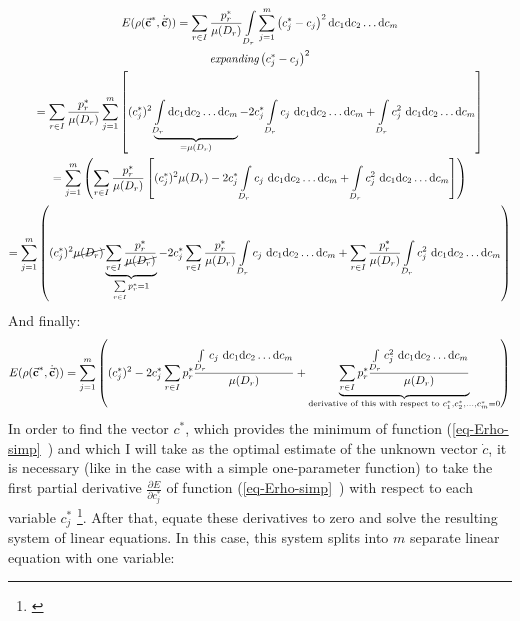 \begin{gather}
\nonumber
E(\rho(\vec{\textbf{c}}^{*},\dot{\vec{\textbf{c}}}))=\sum\limits_{r \in I} \frac{p_{r}^{*}}{\mu(D_{r})} \int\limits_{D_{r}}\sum\limits_{j=1}^{m} \left( c_{j}^{*}-c_{j} \right)^{2}\mathrm{d}c_{1}\mathrm{d}c_{2}\dots \mathrm{d}c_{m}\\
\nonumber
\textit{expanding} \left( c_{j}^{*}-c_{j} \right)^{2} \\
\nonumber
=\sum\limits_{r \in I} \frac{p_{r}^{*}}{\mu(D_{r})} \sum\limits_{j=1}^{m} \left[ (c_{j}^{*})^{2} \underbrace{\int\limits_{D_{r}} \mathrm{d}c_{1}\mathrm{d}c_{2}\dots \mathrm{d}c_{m}}_{{=\mu(D_{r})}} - 2c_{j}^{*} \int\limits_{D_{r}} c_{j} \  \mathrm{d}c_{1}\mathrm{d}c_{2}\dots \mathrm{d}c_{m} + \int\limits_{D_{r}} c_{j}^{2} \  \mathrm{d}c_{1}\mathrm{d}c_{2}\dots \mathrm{d}c_{m}\right]\\
\nonumber
=\sum\limits_{j=1}^{m} \left( \sum\limits_{r \in I} \frac{p_{r}^{*}}{\mu(D_{r})} \left[ (c_{j}^{*})^{2} \mu(D_{r})-2c_{j}^{*} \int\limits_{D_{r}} c_{j} \  \mathrm{d}c_{1}\mathrm{d}c_{2}\dots \mathrm{d}c_{m} + \int\limits_{D_{r}} c_{j}^{2} \  \mathrm{d}c_{1}\mathrm{d}c_{2}\dots \mathrm{d}c_{m} \right] \right)\\ 
=\sum\limits_{j=1}^{m} \left( (c_{j}^{*})^{2} \cancel{\mu(D_{r})} \underbrace{\sum\limits_{r \in I} \frac{p_{r}^{*}}{\cancel{\mu(D_{r})}}}_{\sum\limits_{r \in I}p_{r}^{*} = 1} - 2c_{j}^{*} \sum\limits_{r \in I}\frac{p_{r}^{*}}{\mu(D_{r})} \int\limits_{D_{r}} c_{j} \  \mathrm{d}c_{1}\mathrm{d}c_{2}\dots \mathrm{d}c_{m} + \sum\limits_{r \in I}\frac{p_{r}^{*}}{\mu(D_{r})} \int\limits_{D_{r}} c_{j}^{2} \  \mathrm{d}c_{1}\mathrm{d}c_{2}\dots \mathrm{d}c_{m} \right)
\end{gather}
And finally:
\begin{equation}
E(\rho(\vec{\textbf{c}}^{*},\dot{\vec{\textbf{c}}}))= \sum\limits_{j=1}^{m} \left( (c_{j}^{*})^{2} - 2c_{j}^{*} \sum\limits_{r \in I} p_{r}^{*} \frac{\int\limits_{D_{r}} c_{j} \  \mathrm{d}c_{1}\mathrm{d}c_{2}\dots \mathrm{d}c_{m}}{\mu(D_{r})} + \underbrace{\sum\limits_{r \in I} p_{r}^{*} \frac{\int\limits_{D_{r}} c_{j}^{2} \  \mathrm{d}c_{1}\mathrm{d}c_{2}\dots \mathrm{d}c_{m}}{\mu(D_{r})}}_{\text{derivative of this with respect to } c_{1}^{*}, c_{2}^{*},\dots,c_{m}^{*} = 0} \right) \label{eq-Erho-simp}
\end{equation}
In order to find the vector $c^{*}$, which provides the minimum of function (\vref{eq-Erho-simp}~) and which I will take as the optimal estimate of the unknown vector $\dot{c}$, it is necessary (like in the case with a simple one-parameter function) to take the first partial derivative $\frac{\partial E}{\partial c_{j}^{*}}$ of function (\vref{eq-Erho-simp}~) with respect to each variable $c_{j}^{*}$ \footnote{\cite{stewart_2008_deriv}}. After that, equate these derivatives to zero and solve the resulting system of linear equations. In this case, this system splits into $m$ separate linear equation with one variable:
